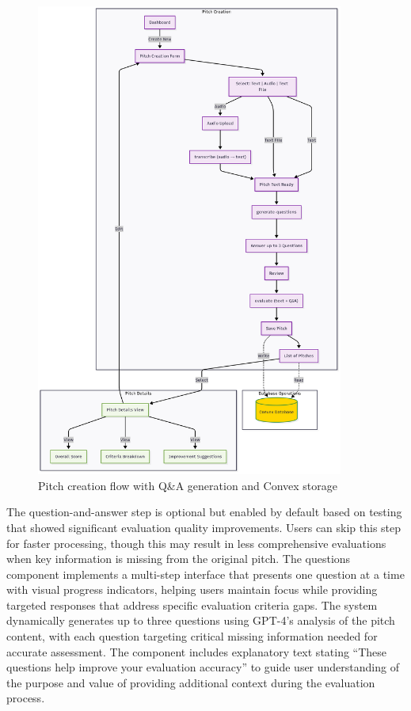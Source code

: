 \begin{figure}[H]
  \centering
  \includegraphics[width=0.9\textwidth]{img/user-flow-pitch}
\caption{Pitch creation flow with Q\&A generation and Convex storage}
  \label{fig:user-flow-pitch}
\end{figure}

The question-and-answer step is optional but enabled by default based on testing that showed significant evaluation quality improvements. Users can skip this step for faster processing, though this may result in less comprehensive evaluations when key information is missing from the original pitch. The questions component implements a multi-step interface that presents one question at a time with visual progress indicators, helping users maintain focus while providing targeted responses that address specific evaluation criteria gaps. The system dynamically generates up to three questions using GPT-4's analysis of the pitch content, with each question targeting critical missing information needed for accurate assessment. The component includes explanatory text stating ``These questions help improve your evaluation accuracy'' to guide user understanding of the purpose and value of providing additional context during the evaluation process.

